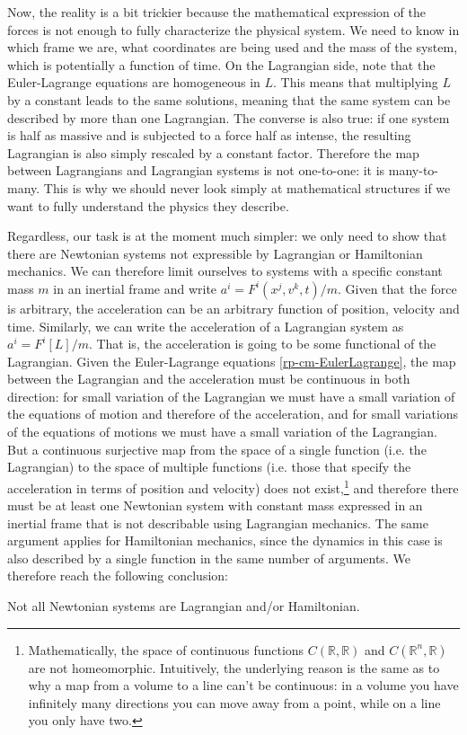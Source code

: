 Now, the reality is a bit trickier because the mathematical expression of the forces is not enough to fully characterize the physical system. We need to know in which frame we are, what coordinates are being used and the mass of the system, which is potentially a function of time. On the Lagrangian side, note that the Euler-Lagrange equations are homogeneous in $L$. This means that multiplying $L$ by a constant leads to the same solutions, meaning that the same system can be described by more than one Lagrangian. The converse is also true: if one system is half as massive and is subjected to a force half as intense, the resulting Lagrangian is also simply rescaled by a constant factor. Therefore the map between Lagrangians and Lagrangian systems is not one-to-one: it is many-to-many. This is why we should never look simply at mathematical structures if we want to fully understand the physics they describe.

Regardless, our task is at the moment much simpler: we only need to show that there are Newtonian systems not expressible by Lagrangian or Hamiltonian mechanics. We can therefore limit ourselves to systems with a specific constant mass $m$ in an inertial frame and write $a^i=F^i(x^j, v^k, t)/m$. Given that the force is arbitrary, the acceleration can be an arbitrary function of position, velocity and time. Similarly, we can write the acceleration of a Lagrangian system as $a^i=F^i[L]/m$. That is, the acceleration is going to be some functional of the Lagrangian. Given the Euler-Lagrange equations \ref{rp-cm-EulerLagrange}, the map between the Lagrangian and the acceleration must be continuous in both direction: for small variation of the Lagrangian we must have a small variation of the equations of motion and therefore of the acceleration, and for small variations of the equations of motions we must have a small variation of the Lagrangian. But a continuous surjective map from the space of a single function (i.e. the Lagrangian) to the space of multiple functions (i.e. those that specify the acceleration in terms of position and velocity) does not exist,\footnote{Mathematically, the space of continuous functions $C(\mathbb{R}, \mathbb{R})$ and $C(\mathbb{R}^n, \mathbb{R})$ are not homeomorphic. Intuitively, the underlying reason is the same as to why a map from a volume to a line can't be continuous: in a volume you have infinitely many directions you can move away from a point, while on a line you only have two.} and therefore there must be at least one Newtonian system with constant mass expressed in an inertial frame that is not describable using Lagrangian mechanics. The same argument applies for Hamiltonian mechanics, since the dynamics in this case is also described by a single function in the same number of arguments. We therefore reach the following conclusion:
\begin{insight}
	Not all Newtonian systems are Lagrangian and/or Hamiltonian.
\end{insight}

